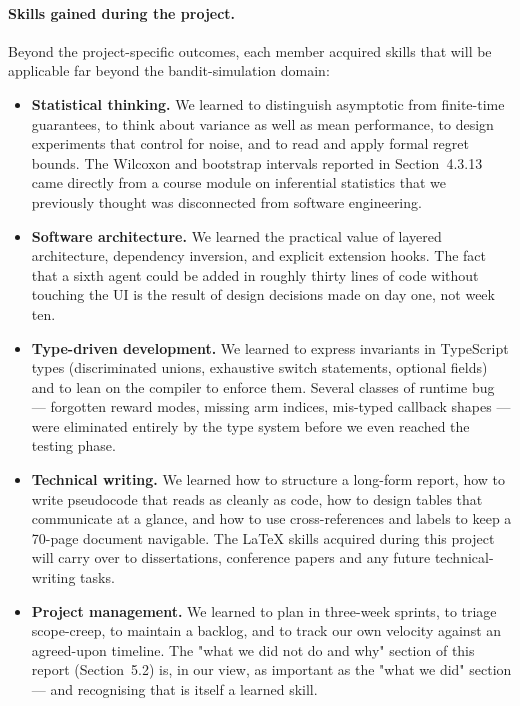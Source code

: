 \paragraph{Skills gained during the project.}
Beyond the project-specific outcomes, each member acquired skills that will be applicable far beyond the bandit-simulation domain:
\begin{itemize}\itemsep0pt
  \item \textbf{Statistical thinking.} We learned to distinguish asymptotic from finite-time guarantees, to think about variance as well as mean performance, to design experiments that control for noise, and to read and apply formal regret bounds. The Wilcoxon and bootstrap intervals reported in Section~4.3.13 came directly from a course module on inferential statistics that we previously thought was disconnected from software engineering.
  \item \textbf{Software architecture.} We learned the practical value of layered architecture, dependency inversion, and explicit extension hooks. The fact that a sixth agent could be added in roughly thirty lines of code without touching the UI is the result of design decisions made on day one, not week ten.
  \item \textbf{Type-driven development.} We learned to express invariants in TypeScript types (discriminated unions, exhaustive switch statements, optional fields) and to lean on the compiler to enforce them. Several classes of runtime bug --- forgotten reward modes, missing arm indices, mis-typed callback shapes --- were eliminated entirely by the type system before we even reached the testing phase.
  \item \textbf{Technical writing.} We learned how to structure a long-form report, how to write pseudocode that reads as cleanly as code, how to design tables that communicate at a glance, and how to use cross-references and labels to keep a 70-page document navigable. The LaTeX skills acquired during this project will carry over to dissertations, conference papers and any future technical-writing tasks.
  \item \textbf{Project management.} We learned to plan in three-week sprints, to triage scope-creep, to maintain a backlog, and to track our own velocity against an agreed-upon timeline. The "what we did not do and why" section of this report (Section~5.2) is, in our view, as important as the "what we did" section --- and recognising that is itself a learned skill.
\end{itemize}

